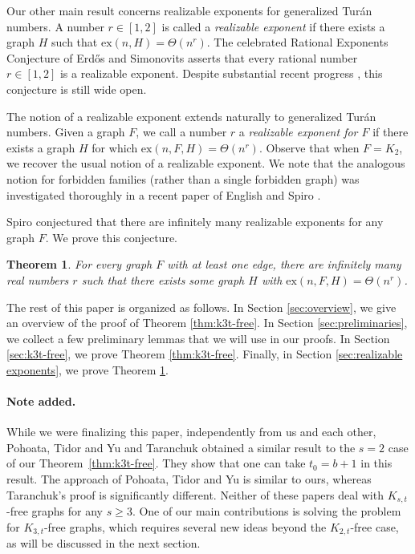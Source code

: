 \documentclass[12pt]{article}
\newtheorem{theorem}{Theorem}[section]
\newcommand{\ex}{\mathrm{ex}}
\begin{document}
Our other main result concerns realizable exponents for generalized Tur\'an numbers. A number $r\in [1,2]$ is called a \emph{realizable exponent} if there exists a graph $H$ such that $\ex(n,H)=\Theta(n^r)$. The celebrated Rational Exponents Conjecture of Erd\H os and Simonovits \cite{erdHos1981combinatorial} asserts that every rational number $r\in [1,2]$ is a realizable exponent. Despite substantial recent progress \cite{bukh2018rational, JiangMaYepremyan, kang2021rational, CJL, JiangQiu1, JanzerSub, JiangQiu2, conlon2022rational}, this conjecture is still wide open.

The notion of a realizable exponent extends naturally to generalized Tur\'an numbers. Given a graph $F$, we call a number $r$ a \emph{realizable exponent for $F$} if there exists a graph $H$ for which $\ex(n,F,H)=\Theta(n^r)$. Observe that when $F=K_2$, we recover the usual notion of a realizable exponent. We note that the analogous notion for forbidden families (rather than a single forbidden graph) was investigated thoroughly in a recent paper of English and Spiro \cite{english2025rational}.

Spiro \cite{spiro} conjectured that there are infinitely many realizable exponents for any graph $F$. We prove this conjecture.

\begin{theorem} \label{thm:realizable exponents}
    For every graph $F$ with at least one edge, there are infinitely many real numbers $r$ such that there exists some graph $H$ with $\ex(n,F,H)=\Theta(n^r)$.
\end{theorem}

The rest of this paper is organized as follows. In Section \ref{sec:overview}, we give an overview of the proof of Theorem \ref{thm:k3t-free}. In Section \ref{sec:preliminaries}, we collect a few preliminary lemmas that we will use in our proofs. In Section \ref{sec:k3t-free}, we prove Theorem \ref{thm:k3t-free}. Finally, in Section \ref{sec:realizable exponents}, we prove Theorem \ref{thm:realizable exponents}.

\paragraph{Note added.} While we were finalizing this paper, independently from us and each other, Pohoata, Tidor and Yu \cite{PTY26} and Taranchuk \cite{taranchuk} obtained a similar result to the $s=2$ case of our Theorem~\ref{thm:k3t-free}. They show that one can take $t_0=b+1$ in this result. The approach of Pohoata, Tidor and Yu is similar to ours, whereas Taranchuk's proof is significantly different. Neither of these papers deal with $K_{s,t}$-free graphs for any $s\geq 3$. One of our main contributions is solving the problem for $K_{3,t}$-free graphs, which requires several new ideas beyond the $K_{2,t}$-free case, as will be discussed in the next section.
\end{document}
